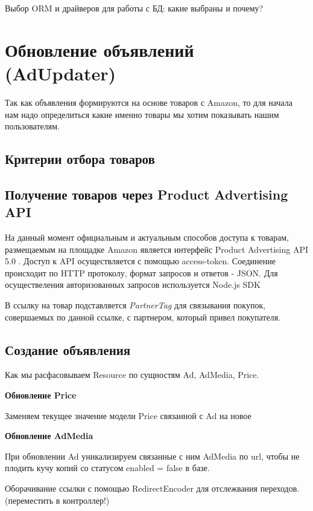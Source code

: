\documentclass[times]{itmo-student-thesis}
\begin{document}
Выбор ORM и драйверов для работы с БД: какие выбраны и почему?



\section{Обновление объявлений (AdUpdater)}

Так как объявления формируются на основе товаров с Amazon, то для начала нам надо определиться какие именно товары мы хотим показывать нашим пользователям.

\subsection{Критерии отбора товаров}

\subsection{Получение товаров через Product Advertising API}

На данный момент официальным и актуальным способов доступа к товарам, размещаемым на площадке Amazon является интерфейс Product Advertising API 5.0 \cite{amazon-paapi-docs}. Доступ к API осуществляется с помощью access-token. Соединение происходит по HTTP протоколу, формат запросов и ответов - JSON. Для осуществеления авторизованных запросов используется Node.js SDK \cite{amazon-paapi-sdk}

В ссылку на товар подставляется \textit{PartnerTag} для связывания покупок, совершаемых по данной ссылке, с партнером, который привел покупателя.

\subsection{Создание объявления}

Как мы расфасовываем Resource по сущностям Ad, AdMedia, Price.

\textbf{Обновление Price}

Заменяем текущее значение модели Price связанной с Ad на новое

\textbf{Обновление AdMedia}

При обновлении Ad уникализируем связанные с ним AdMedia по url, чтобы не плодить кучу копий со статусом enabled = false в базе.


Оборачивание ссылки с помощью RedirectEncoder для отслежвания переходов. (переместить в контроллер!)
\end{document}
